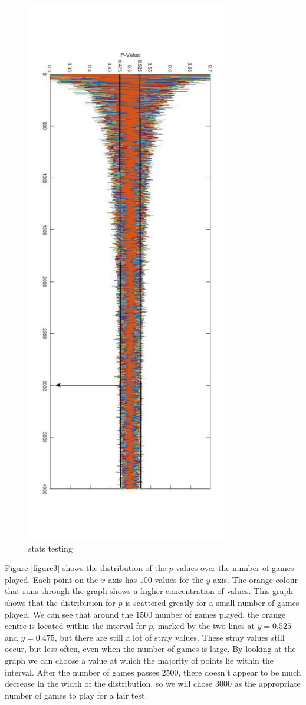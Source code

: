 \documentclass[a4paper,titlepage]{article}
\begin{document}
\begin{figure}
\centering
\includegraphics[height=24cm]{stats_testing}
\caption{stats testing\label{figure4}}
\end{figure}
Figure \ref{figure3} shows the distribution of the $p$-values over the number of games played. Each point on the $x$-axis has $100$ values for the $y$-axis. The orange colour that runs through the graph shows a higher concentration of values. This graph shows that the distribution for $p$ is scattered greatly for a small number of games played. We can see that around the $1500$ number of games played, the orange centre is located within the interval for $p$, marked by the two lines at $y=0.525$ and $y=0.475$, but there are still a lot of stray values. These stray values still occur, but less often, even when the number of games is large. By looking at the graph we can choose a value at which the majority of points lie within the interval. After the number of games passes $2500$, there doesn’t appear to be much decrease in the width of the distribution, so we will chose $3000$ as the appropriate number of games to play for a fair test.\\ \\
\end{document}
